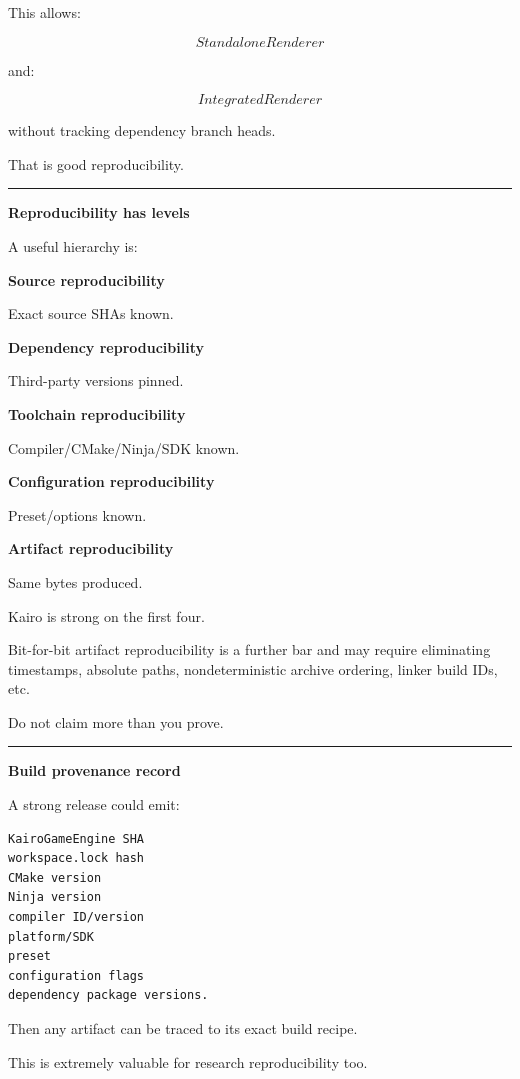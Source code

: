 This allows:

\[
StandaloneRenderer
\]

and:

\[
IntegratedRenderer
\]

without tracking dependency branch heads.

That is good reproducibility.

\begin{center}\rule{0.5\linewidth}{0.5pt}\end{center}

\textbf{Reproducibility has levels}

A useful hierarchy is:

\textbf{Source reproducibility}

Exact source SHAs known.

\textbf{Dependency reproducibility}

Third-party versions pinned.

\textbf{Toolchain reproducibility}

Compiler/CMake/Ninja/SDK known.

\textbf{Configuration reproducibility}

Preset/options known.

\textbf{Artifact reproducibility}

Same bytes produced.

Kairo is strong on the first four.

Bit-for-bit artifact reproducibility is a further bar and may require eliminating timestamps, absolute paths, nondeterministic archive ordering, linker build IDs, etc.

Do not claim more than you prove.

\begin{center}\rule{0.5\linewidth}{0.5pt}\end{center}

\textbf{Build provenance record}

A strong release could emit:

\begin{verbatim}
KairoGameEngine SHA
workspace.lock hash
CMake version
Ninja version
compiler ID/version
platform/SDK
preset
configuration flags
dependency package versions.
\end{verbatim}

Then any artifact can be traced to its exact build recipe.

This is extremely valuable for research reproducibility too.

